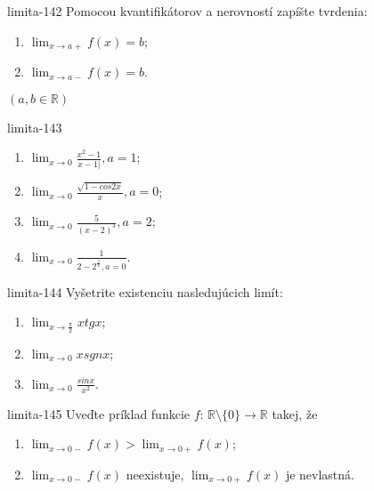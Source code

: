 \begin{defproblem}{limita-142}
Pomocou kvantifikátorov a nerovností zapíšte tvrdenia:
\begin{enumerate}
\item $\lim_{x \rightarrow a+} f(x)=b$;
\item $\lim_{x \rightarrow a-} f(x)=b$.
\end{enumerate}
$(a,b \in \mathbb{R})$
\end{defproblem}

\begin{defproblem}{limita-143}
\begin{multicols}{2}
\begin{enumerate}
    \item $\lim_{{x \rightarrow 0}} \frac{x^2-1}{x-1|},a=1$;
    \item $\lim_{{x \rightarrow 0}} \frac{\sqrt{1-cos 2x}}{x},a=0$;
    \item $\lim_{{x \rightarrow 0}} \frac{5}{(x-2)^3},a=2$;
    \item $\lim_{{x \rightarrow 0}} \frac{1}{2-2^{\frac{1}{x}},a=0}$.
\end{enumerate}
\end{multicols}
\end{defproblem}

\begin{defproblem}{limita-144}
Vyšetrite existenciu nasledujúcich limít:
\begin{enumerate}
\item $\lim_{x \rightarrow \frac{\pi}{2}} x tg x$;
\item $\lim_{x \rightarrow 0} x sgn x$;
\item $\lim_{x \rightarrow 0} \frac{sin x}{x^2}$.
\end{enumerate}
\end{defproblem}

\begin{defproblem}{limita-145}
Uveďte príklad funkcie $f$: $\mathbb{R} \setminus \{ 0\} \rightarrow \mathbb{R}$ takej, že
\begin{enumerate}
\item $\lim_{x \rightarrow 0-} f(x)>\lim_{x \rightarrow 0+} f(x)$;
\item $\lim_{x \rightarrow 0-} f(x)$ neexistuje, $\lim_{x \rightarrow 0+} f(x)$ je nevlastná.
\end{enumerate}
\end{defproblem}

